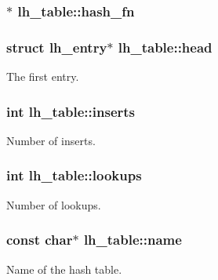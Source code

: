 \subsubsection[{\texorpdfstring{hash\+\_\+fn}{hash_fn}}]{$\ast$ lh\+\_\+table\+::hash\+\_\+fn}\hypertarget{structlh__table_a1488d1a4a320b1a9bb2f441859544be1}{}\label{structlh__table_a1488d1a4a320b1a9bb2f441859544be1}
\subsubsection[{\texorpdfstring{head}{head}}]{\setlength{\rightskip}{0pt plus 5cm}struct {\bf lh\+\_\+entry}$\ast$ lh\+\_\+table\+::head}\hypertarget{structlh__table_aa7d986a3b12a9fa47e349713794c30fb}{}\label{structlh__table_aa7d986a3b12a9fa47e349713794c30fb}
The first entry. 
\subsubsection[{\texorpdfstring{inserts}{inserts}}]{\setlength{\rightskip}{0pt plus 5cm}int lh\+\_\+table\+::inserts}\hypertarget{structlh__table_afd64becd0d2cfbc91a4c9c9a117498b9}{}\label{structlh__table_afd64becd0d2cfbc91a4c9c9a117498b9}
Number of inserts. 
\subsubsection[{\texorpdfstring{lookups}{lookups}}]{\setlength{\rightskip}{0pt plus 5cm}int lh\+\_\+table\+::lookups}\hypertarget{structlh__table_afd0385c645413d26e682f725a6f52164}{}\label{structlh__table_afd0385c645413d26e682f725a6f52164}
Number of lookups. 
\subsubsection[{\texorpdfstring{name}{name}}]{\setlength{\rightskip}{0pt plus 5cm}const char$\ast$ lh\+\_\+table\+::name}\hypertarget{structlh__table_aebf4001cde3746ec8025c1d87d4e6279}{}\label{structlh__table_aebf4001cde3746ec8025c1d87d4e6279}
Name of the hash table. 
